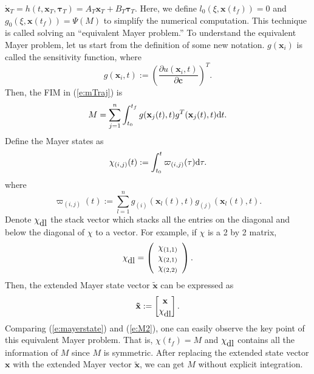 $\mathbf{\dot x}_T=h(t,\mathbf{x}_T,\mathbf{\tau}_T)=A_T \mathbf{x}_T + B_T \mathbf{\tau}_T.$
Here, we define
     $l_0(\xi, \mathbf{x}(t_f))=0 $
and
     $g_0(\xi, \mathbf{x}(t_f))=\Psi(M)$
to simplify the numerical computation.
This technique is called solving an ``equivalent Mayer problem.''
    To understand the equivalent Mayer problem, let us start from the definition of some new notation.
    $g(\mathbf{x}_{i})$ is called the sensitivity function, where
    $$g(\mathbf{x}_i,t) := \left(\frac{\partial u(\mathbf{x}_i,t)}{\partial \mathbf{c}}\right)^T. $$
Then, the FIM in (\ref{e:mTraj}) is
    \begin{equation} \label{e:M2}
        M=\sum_{j=1}^n \int_{t_0}^{t_f} g(\mathbf{x}_j(t),t) g^T(\mathbf{x}_j(t),t) \hbox{d}t .
    \end{equation}
   Define the Mayer states as
    \begin{equation}\label{e:mayerstate}
        \chi_{(i,j)}(t) := \int_{t_0}^{t}  \varpi_{(i,j)}(\tau) {\rm d}\tau.
    \end{equation}
    where
    \begin{equation*}
        \varpi_{(i,j)}(t) := \sum_{l=1}^n  g_{(i)}(\mathbf{x}_l(t),t) g_{(j)}(\mathbf{x}_l(t),t).
    \end{equation*}
Denote $\chi_{\hbox{dl}}$  the stack vector which stacks all the entries on the diagonal and below the diagonal of $\chi$ to a vector. For example, if $\chi$ is a 2 by 2 matrix,
$$\chi_{\hbox{dl}}= \left(
                      \begin{array}{c}
                        \chi_{(1,1)} \\
                        \chi_{(2,1)} \\
                        \chi_{(2,2)} \\
                      \end{array}
                    \right)
.$$
Then,  the extended Mayer state vector $\mathbf{\tilde x}$ can be expressed as
    $$\mathbf{\tilde x} :=
    \begin{bmatrix}
        \mathbf{x} \\
        \chi_{\hbox{dl}}
    \end{bmatrix}. $$
    Comparing (\ref{e:mayerstate}) and (\ref{e:M2}), one can easily observe  the key point of this equivalent Mayer problem. That is, $\chi(t_f)=M$  and $\chi_{\hbox{dl}}$ contains all the information of $M$  since $M$ is symmetric. After replacing the extended state vector $\mathbf{x}$ with the extended Mayer vector $\mathbf{\tilde x}$, we can get $M$ without explicit integration.


